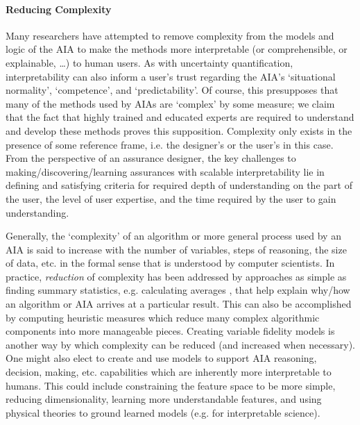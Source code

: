     \paragraph{Reducing Complexity} Many researchers have attempted to remove complexity from the models and logic of the AIA to make the methods more interpretable (or comprehensible, or explainable, \ldots) to human users. 
As with uncertainty quantification, interpretability can also inform a user's trust regarding the AIA's `situational normality', `competence', and `predictability'. Of course, this presupposes that many of the methods used by AIAs are `complex' by some measure; we claim that the fact that highly trained and educated experts are required to understand and develop these methods %
proves this supposition. Complexity only exists in the presence of some reference frame, i.e. the designer's or the user's in this case. 
From the perspective of an assurance designer, the key challenges to making/discovering/learning assurances with scalable interpretability lie in defining and satisfying criteria for required depth of understanding on the part of the user, the level of user expertise, and the time required by the user to gain understanding. 

Generally, the `complexity' of an algorithm or more general process used by an AIA is said to increase with the number of variables, steps of reasoning, the size of data, etc. in the formal sense that is understood by computer scientists. 
In practice, \textit{reduction} of complexity has been addressed by approaches as simple as finding summary statistics, e.g. calculating averages \cite{Muir1994-ow,Muir1996-gt}, that help explain why/how an algorithm or AIA arrives at a particular result. 
This can also be accomplished by computing heuristic measures which reduce many complex algorithmic components into more manageable pieces\cite{Aitken2016-cv}. Creating variable fidelity models is another way by which complexity can be reduced (and increased when necessary). One might also elect to create and use models to support AIA reasoning, decision, making, etc. capabilities which are inherently more interpretable to humans. This could include constraining the feature space to be more simple, reducing dimensionality, learning more understandable features, and using physical theories to ground learned models (e.g. for interpretable science).  %
    
